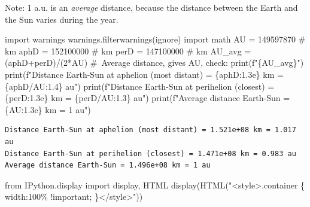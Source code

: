 \documentclass[
  letterpaper,
  DIV=11,
  numbers=noendperiod]{scrreprt}
\newenvironment{Shaded}{\begin{snugshade}}{\end{snugshade}}
\newcommand{\BuiltInTok}[1]{\textcolor[rgb]{0.00,0.23,0.31}{#1}}
\newcommand{\CommentTok}[1]{\textcolor[rgb]{0.37,0.37,0.37}{#1}}
\newcommand{\DecValTok}[1]{\textcolor[rgb]{0.68,0.00,0.00}{#1}}
\newcommand{\ImportTok}[1]{\textcolor[rgb]{0.00,0.46,0.62}{#1}}
\newcommand{\NormalTok}[1]{\textcolor[rgb]{0.00,0.23,0.31}{#1}}
\newcommand{\OperatorTok}[1]{\textcolor[rgb]{0.37,0.37,0.37}{#1}}
\newcommand{\SpecialCharTok}[1]{\textcolor[rgb]{0.37,0.37,0.37}{#1}}
\newcommand{\SpecialStringTok}[1]{\textcolor[rgb]{0.13,0.47,0.30}{#1}}
\newcommand{\StringTok}[1]{\textcolor[rgb]{0.13,0.47,0.30}{#1}}
\begin{document}
Note: 1 a.u. is an \emph{average} distance, because the distance between
the Earth and the Sun varies during the year.

\begin{Shaded}
\begin{Highlighting}[]
\ImportTok{import}\NormalTok{ warnings}
\NormalTok{warnings.filterwarnings(}\StringTok{\textquotesingle{}ignore\textquotesingle{}}\NormalTok{)}
\ImportTok{import}\NormalTok{ math}
\NormalTok{AU }\OperatorTok{=} \DecValTok{149597870} \CommentTok{\# km}
\NormalTok{aphD }\OperatorTok{=} \DecValTok{152100000} \CommentTok{\# km}
\NormalTok{perD }\OperatorTok{=} \DecValTok{147100000} \CommentTok{\# km}
\NormalTok{AU\_avg }\OperatorTok{=}\NormalTok{ (aphD}\OperatorTok{+}\NormalTok{perD)}\OperatorTok{/}\NormalTok{(}\DecValTok{2}\OperatorTok{*}\NormalTok{AU) }\CommentTok{\# Average distance, gives AU, check: print(f"\{AU\_avg\}")}
\BuiltInTok{print}\NormalTok{(}\SpecialStringTok{f"Distance Earth{-}Sun at aphelion (most distant) = }\SpecialCharTok{\{}\NormalTok{aphD}\SpecialCharTok{:1.3e\}}\SpecialStringTok{ km = }\SpecialCharTok{\{}\NormalTok{aphD}\OperatorTok{/}\NormalTok{AU}\SpecialCharTok{:1.4\}}\SpecialStringTok{ au"}\NormalTok{)}
\BuiltInTok{print}\NormalTok{(}\SpecialStringTok{f"Distance Earth{-}Sun at perihelion (closest) = }\SpecialCharTok{\{}\NormalTok{perD}\SpecialCharTok{:1.3e\}}\SpecialStringTok{ km = }\SpecialCharTok{\{}\NormalTok{perD}\OperatorTok{/}\NormalTok{AU}\SpecialCharTok{:1.3\}}\SpecialStringTok{ au"}\NormalTok{)}
\BuiltInTok{print}\NormalTok{(}\SpecialStringTok{f"Average distance Earth{-}Sun = }\SpecialCharTok{\{}\NormalTok{AU}\SpecialCharTok{:1.3e\}}\SpecialStringTok{ km = 1 au"}\NormalTok{)}
\end{Highlighting}
\end{Shaded}

\begin{verbatim}
Distance Earth-Sun at aphelion (most distant) = 1.521e+08 km = 1.017 au
Distance Earth-Sun at perihelion (closest) = 1.471e+08 km = 0.983 au
Average distance Earth-Sun = 1.496e+08 km = 1 au
\end{verbatim}

\begin{Shaded}
\begin{Highlighting}[]
\ImportTok{from}\NormalTok{ IPython.display }\ImportTok{import}\NormalTok{ display, HTML}
\NormalTok{display(HTML(}\StringTok{"\textless{}style\textgreater{}.container \{ width:100\% !important; \}\textless{}/style\textgreater{}"}\NormalTok{))}
\end{Highlighting}
\end{Shaded}
\end{document}
